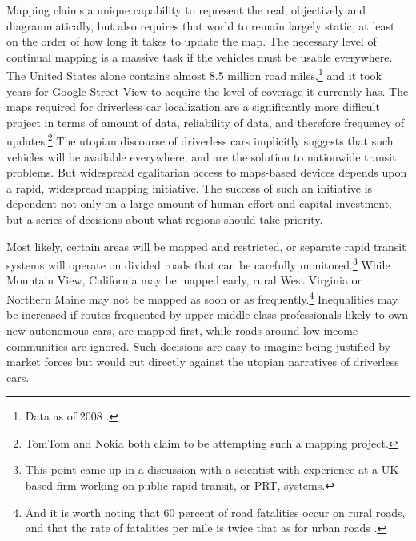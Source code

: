 Mapping claims a unique capability to
represent the real, objectively
and diagrammatically, but also requires that world to remain largely
static, at least on the order of how long it takes to update the map.
The necessary level of continual mapping is a massive task if the 
vehicles must be usable everywhere. The United States alone contains almost
8.5 million road miles,\footnote{Data as of 2008 \cite{carneyMiles}.}
and it took years for Google Street View to acquire the level of
coverage it currently has. The maps required for driverless car
localization are a significantly more difficult project in terms of
amount of data, reliability of data, and therefore frequency of
updates.\footnote{TomTom \cite{tomtommaps} and Nokia \cite{ubergizmo}
  both claim to be attempting such 
a mapping project.} The utopian discourse of driverless cars
implicitly suggests that such vehicles will be available everywhere,
and are the solution to nationwide transit problems. But widespread
egalitarian access to maps-based devices depends upon a rapid,
widespread mapping initiative. The success of such an initiative is
dependent not only on a large amount of human effort and capital
investment, but a series of decisions about what regions should take priority.

Most likely,
certain areas will be 
mapped and restricted, or separate rapid transit
systems will operate on divided roads that can be carefully
monitored.\footnote{This point came up in a discussion with a
  scientist with experience at a UK-based firm working on public
  rapid transit, or PRT, systems.} While
Mountain View, California may be mapped early, rural West Virginia or
Northern Maine may not be mapped as soon or as
frequently.\footnote{And it is worth noting that 60 percent of road
  fatalities occur on rural roads, and that the rate of fatalities per
mile is twice that as for urban roads \cite[p. 11]{broviakCars}.}
Inequalities may be increased if routes frequented by upper-middle
class professionals likely to own new autonomous cars,
are mapped first, while roads around low-income communities are
ignored. Such decisions are easy to imagine being justified by
market forces but would
cut directly against the utopian narratives of driverless cars.

